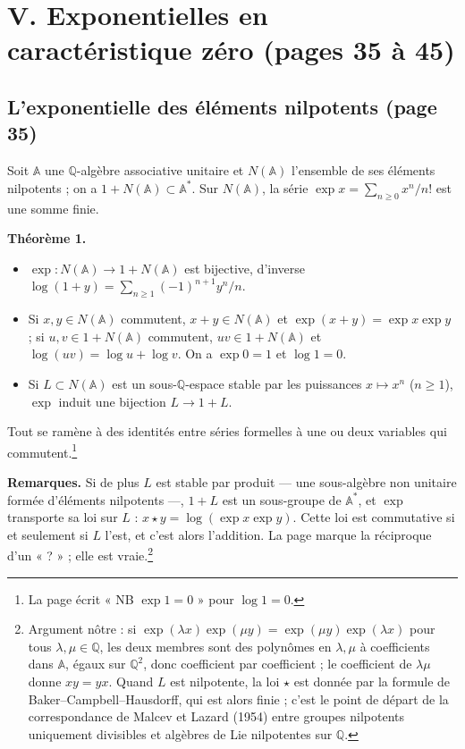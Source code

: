 \documentclass[11pt,a4paper]{article}
\begin{document}
\section*{V. Exponentielles en caractéristique zéro (pages 35 à 45)}

\subsection*{L'exponentielle des éléments nilpotents (page 35)}

Soit $\mathbb{A}$ une $\mathbb{Q}$-algèbre associative unitaire et
$N(\mathbb{A})$ l'ensemble de ses éléments nilpotents ; on a
$1 + N(\mathbb{A}) \subset \mathbb{A}^*$. Sur $N(\mathbb{A})$, la série
$\exp x = \sum_{n \geqslant 0} x^n / n!$ est une somme finie.

\textbf{Théorème 1.}
\begin{itemize}
  \item[1)] $\exp : N(\mathbb{A}) \to 1 + N(\mathbb{A})$ est bijective,
  d'inverse $\log(1 + y) = \sum_{n \geqslant 1} (-1)^{n+1} y^n / n$.
  \item[2)] Si $x, y \in N(\mathbb{A})$ commutent, $x + y \in N(\mathbb{A})$
  et $\exp(x + y) = \exp x \exp y$ ; si $u, v \in 1 + N(\mathbb{A})$
  commutent, $uv \in 1 + N(\mathbb{A})$ et $\log(uv) = \log u + \log v$. On a
  $\exp 0 = 1$ et $\log 1 = 0$.
  \item[3)] Si $L \subset N(\mathbb{A})$ est un sous-$\mathbb{Q}$-espace
  stable par les puissances $x \mapsto x^n$ ($n \geqslant 1$), $\exp$ induit
  une bijection $L \to 1 + L$.
\end{itemize}
Tout se ramène à des identités entre séries formelles à une ou deux
variables qui commutent.\footnote{La page écrit « NB $\exp 1 = 0$ » pour
$\log 1 = 0$.}

\textbf{Remarques.} Si de plus $L$ est stable par produit --- une
sous-algèbre non unitaire formée d'éléments nilpotents ---, $1 + L$ est un
sous-groupe de $\mathbb{A}^*$, et $\exp$ transporte sa loi sur $L$ :
$x \star y = \log(\exp x \exp y)$. Cette loi est commutative si et seulement
si $L$ l'est, et c'est alors l'addition. La page marque la réciproque d'un
« ? » ; elle est vraie.\footnote{Argument nôtre : si
$\exp(\lambda x)\exp(\mu y) = \exp(\mu y)\exp(\lambda x)$ pour tous
$\lambda, \mu \in \mathbb{Q}$, les deux membres sont des polynômes en
$\lambda, \mu$ à coefficients dans $\mathbb{A}$, égaux sur
$\mathbb{Q}^2$, donc coefficient par coefficient ; le coefficient de
$\lambda\mu$ donne $xy = yx$. Quand $L$ est nilpotente, la loi $\star$ est
donnée par la formule de Baker--Campbell--Hausdorff, qui est alors finie ;
c'est le point de départ de la correspondance de Malcev et Lazard (1954)
entre groupes nilpotents uniquement divisibles et algèbres de Lie nilpotentes
sur $\mathbb{Q}$.}
\end{document}

